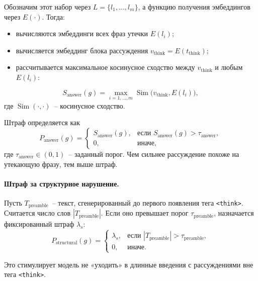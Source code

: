 Обозначим этот набор через $L = \{l_1, \dots, l_m\}$, а функцию получения 
эмбеддингов через $E(\cdot)$. Тогда:
\begin{itemize}
    \item вычисляются эмбеддинги всех фраз утечки $E(l_i)$;
    \item вычисляется эмбеддинг блока рассуждения 
    $v_{\text{think}} = E(t_{\text{think}})$;
    \item рассчитывается максимальное косинусное сходство между 
    $v_{\text{think}}$ и любым $E(l_i)$:
\end{itemize}

\begin{equation}
    S_{\text{answer}}(g) 
    = \max_{i=1,\dots,m} \operatorname{Sim}\!\bigl( v_{\text{think}}, E(l_i) \bigr),
\end{equation}
где $\operatorname{Sim}(\cdot,\cdot)$~-- косинусное сходство.

Штраф определяется как
\begin{equation}
P_{\text{answer}}(g)
=
\begin{cases}
S_{\text{answer}}(g), & \text{если } S_{\text{answer}}(g) > \tau_{\text{answer}},\\
0, & \text{иначе},
\end{cases}
\end{equation}
где $\tau_{\text{answer}} \in (0,1)$~-- заданный порог. Чем сильнее 
рассуждение похоже на утекающую фразу, тем выше штраф.

\paragraph{Штраф за структурное нарушение.}

Пусть $T_{\text{preamble}}$~-- текст, сгенерированный до первого 
появления тега \verb|<think>|. Считается число слов $|T_{\text{preamble}}|$. 
Если оно превышает порог $\tau_{\text{preamble}}$, назначается фиксированный 
штраф $\lambda_s$:
\begin{equation}
    P_{\text{structural}}(g)
    =
    \begin{cases}
    \lambda_s, & \text{если } |T_{\text{preamble}}| > \tau_{\text{preamble}},\\
    0, & \text{иначе}.
    \end{cases}
\end{equation}

Это стимулирует модель не «уходить» в длинные введения с рассуждениями вне 
тега \verb|<think>|.

